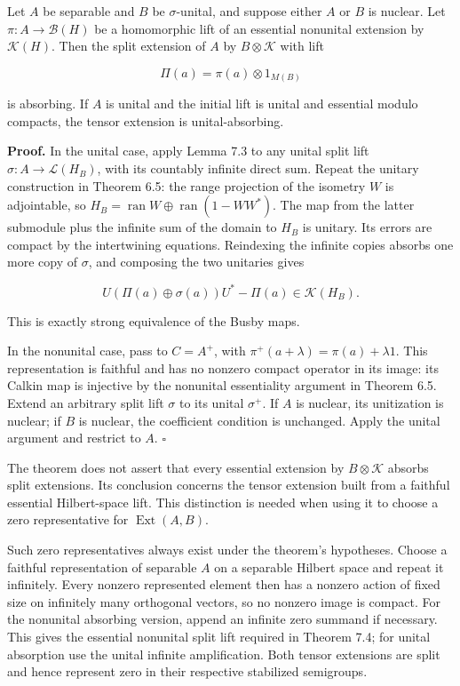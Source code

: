 \documentclass[
  11pt,
]{article}
\begin{document}
Let \(A\) be separable and \(B\) be \(\sigma\)-unital, and suppose
either \(A\) or \(B\) is nuclear. Let \(\pi:A\to\mathcal B(H)\) be a
homomorphic lift of an essential nonunital extension by
\(\mathcal K(H)\). Then the split extension of \(A\) by
\(B\otimes\mathcal K\) with lift

\[
\Pi(a)=\pi(a)\otimes1_{M(B)}
\]

is absorbing. If \(A\) is unital and the initial lift is unital and
essential modulo compacts, the tensor extension is unital-absorbing.

\textbf{Proof.} In the unital case, apply Lemma 7.3 to any unital split
lift \(\sigma:A\to\mathcal L(H_B)\), with its countably infinite direct
sum. Repeat the unitary construction in Theorem 6.5: the range
projection of the isometry \(W\) is adjointable, so
\(H_B=\operatorname{ran}W\oplus\operatorname{ran}(1-WW^*)\). The map
from the latter submodule plus the infinite sum of the domain to \(H_B\)
is unitary. Its errors are compact by the intertwining equations.
Reindexing the infinite copies absorbs one more copy of \(\sigma\), and
composing the two unitaries gives

\[
U(\Pi(a)\oplus\sigma(a))U^*-\Pi(a)
\in\mathcal K(H_B).
\]

This is exactly strong equivalence of the Busby maps.

In the nonunital case, pass to \(C=A^+\), with
\(\pi^+(a+\lambda)=\pi(a)+\lambda1\). This representation is faithful
and has no nonzero compact operator in its image: its Calkin map is
injective by the nonunital essentiality argument in Theorem 6.5. Extend
an arbitrary split lift \(\sigma\) to its unital \(\sigma^+\). If \(A\)
is nuclear, its unitization is nuclear; if \(B\) is nuclear, the
coefficient condition is unchanged. Apply the unital argument and
restrict to \(A\). \(\square\)

The theorem does not assert that every essential extension by
\(B\otimes\mathcal K\) absorbs split extensions. Its conclusion concerns
the tensor extension built from a faithful essential Hilbert-space lift.
This distinction is needed when using it to choose a zero representative
for \(\operatorname{Ext}(A,B)\).

Such zero representatives always exist under the theorem's hypotheses.
Choose a faithful representation of separable \(A\) on a separable
Hilbert space and repeat it infinitely. Every nonzero represented
element then has a nonzero action of fixed size on infinitely many
orthogonal vectors, so no nonzero image is compact. For the nonunital
absorbing version, append an infinite zero summand if necessary. This
gives the essential nonunital split lift required in Theorem 7.4; for
unital absorption use the unital infinite amplification. Both tensor
extensions are split and hence represent zero in their respective
stabilized semigroups.
\end{document}
